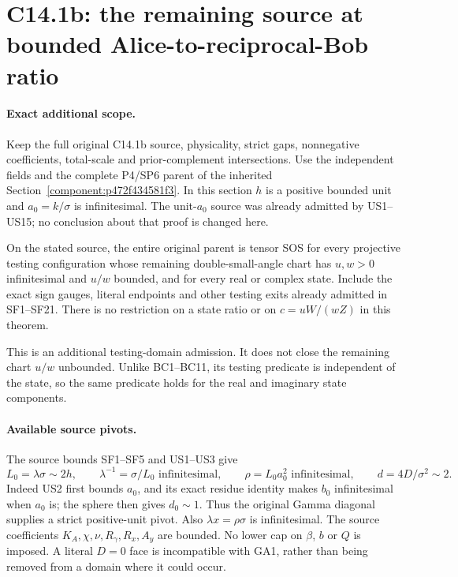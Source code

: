 \section{\texorpdfstring{C14.1b: the remaining source at bounded Alice-to-reciprocal-Bob ratio}{C14.1b: the remaining source at bounded Alice-to-reciprocal-Bob ratio}}
\label{component:p50b4df0bb619}

\label{p50b4df0bb619:sec:c141b-gamma-angular}

\paragraph{Exact additional scope.}
Keep the full original C14.1b source, physicality, strict gaps,
nonnegative coefficients, total-scale and prior-complement
intersections. Use the independent fields and the complete P4/SP6
parent of the inherited Section~\ref{component:p472f434581f3}. In this
section $h$ is a positive bounded unit and $a_0=k/\sigma$ is
infinitesimal. The unit-$a_0$ source was already admitted by
US1--US15; no conclusion about that proof is changed here.

\begin{theorem}
On the stated source, the entire original parent is tensor SOS
for every projective testing configuration whose remaining
double-small-angle chart has $u,w>0$ infinitesimal and $u/w$
bounded, and for every real or complex state. Include the exact
sign gauges, literal endpoints and other testing exits already
admitted in SF1--SF21. There is no restriction on a state ratio
or on $c=uW/(wZ)$ in this theorem.
\end{theorem}

This is an additional testing-domain admission. It does not close
the remaining chart $u/w$ unbounded. Unlike BC1--BC11, its testing
predicate is independent of the state, so the same predicate holds
for the real and imaginary state components.

\paragraph{Available source pivots.}
The source bounds SF1--SF5 and US1--US3 give
\[
 L_0=\lambda\sigma\sim2h,\qquad
 \lambda^{-1}=\sigma/L_0\text{ infinitesimal},\qquad
 \rho=L_0a_0^2\text{ infinitesimal},\qquad
 d=4D/\sigma^2\sim2.
 \tag{GA1}
\]
Indeed US2 first bounds $a_0$, and its exact residue identity makes
$b_0$ infinitesimal when $a_0$ is; the sphere then gives $d_0\sim1$.
Thus the original Gamma diagonal supplies a strict positive-unit
pivot. Also $\lambda x=\rho\sigma$ is infinitesimal. The source
coefficients $K_A,\chi,\nu,R_\gamma,R_x,A_y$ are bounded. No
lower cap on $\beta$, $b$ or $Q$ is imposed. A literal $D=0$ face
is incompatible with GA1, rather than being removed from a domain
where it could occur.

